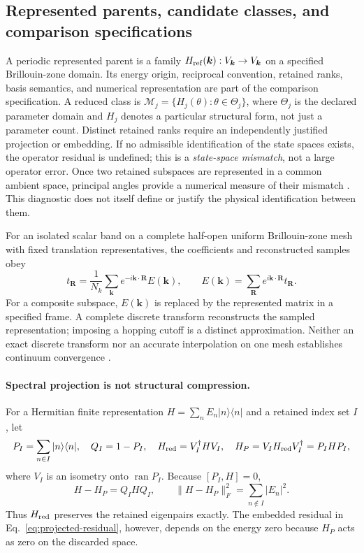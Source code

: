 \documentclass[11pt]{article}
\newcommand{\M}{\mathcal M}\newcommand{\A}{\mathcal A}\newcommand{\U}{\mathcal U}\newcommand{\HH}{\mathcal H}\newcommand{\SH}{\mathcal S_H}\newcommand{\Tr}{\operatorname{tr}}\newcommand{\dist}{\operatorname{dist}}\newcommand{\dd}{\mathrm d}
\begin{document}
\subsection{Represented parents, candidate classes, and comparison specifications}
A periodic represented parent is a family $H_{\rm ref}(\bm k):V_{\bm k}\to V_{\bm k}$ on a specified Brillouin-zone domain. Its energy origin, reciprocal convention, retained ranks, basis semantics, and numerical representation are part of the comparison specification. A reduced class is $\M_j=\{H_j(\theta):\theta\in\Theta_j\}$, where $\Theta_j$ is the declared parameter domain and $H_j$ denotes a particular structural form, not just a parameter count. Distinct retained ranks require an independently justified projection or embedding. If no admissible identification of the state spaces exists, the operator residual is undefined; this is a \emph{state-space mismatch}, not a large operator error. Once two retained subspaces are represented in a common ambient space, principal angles provide a numerical measure of their mismatch \cite{bjorck1973}. This diagnostic does not itself define or justify the physical identification between them.

For an isolated scalar band on a complete half-open uniform Brillouin-zone mesh with fixed translation representatives, the coefficients and reconstructed samples obey
\begin{equation}\label{eq:dft}
 t_{\bm R}=\frac1{N_k}\sum_{\bm k}e^{-i\bm k\cdot\bm R}E(\bm k),\qquad
 E(\bm k)=\sum_{\bm R}e^{i\bm k\cdot\bm R}t_{\bm R}.
\end{equation}
For a composite subspace, $E(\bm k)$ is replaced by the represented matrix in a specified frame. A complete discrete transform reconstructs the sampled representation; imposing a hopping cutoff is a distinct approximation. Neither an exact discrete transform nor an accurate interpolation on one mesh establishes continuum convergence \cite{trefethen2000,higham2002}.

\paragraph{Spectral projection is not structural compression.}
For a Hermitian finite representation $H=\sum_n E_n|n\rangle\langle n|$ and a retained index set $I$, let
\begin{equation}\label{eq:spectral-projection}
P_I=\sum_{n\in I}|n\rangle\langle n|,
\quad Q_I=1-P_I,
\quad H_{\rm red}=V_I^\dagger H V_I,
\quad H_P=V_IH_{\rm red}V_I^\dagger=P_IHP_I,
\end{equation}
where $V_I$ is an isometry onto $\operatorname{ran}P_I$. Because $[P_I,H]=0$,
\begin{equation}\label{eq:projected-residual}
H-H_P=Q_IHQ_I,
\qquad \|H-H_P\|_F^2=\sum_{n\notin I}|E_n|^2.
\end{equation}
Thus $H_{\rm red}$ preserves the retained eigenpairs exactly. The embedded residual in Eq.~\eqref{eq:projected-residual}, however, depends on the energy zero because $H_P$ acts as zero on the discarded space.
\end{document}
